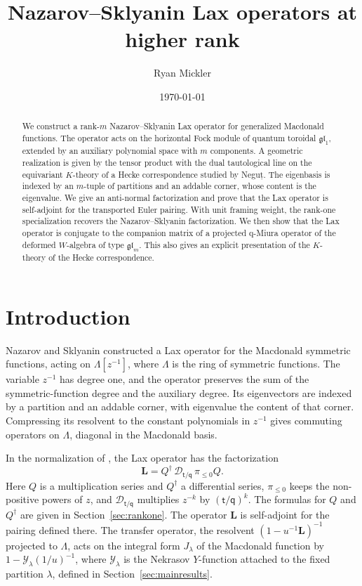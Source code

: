 \documentclass[11pt]{amsart}
\title{Nazarov--Sklyanin Lax operators at higher rank}
\author{Ryan Mickler}
\date{\today}
\theoremstyle{definition}
\theoremstyle{remark}
\newcommand{\Mq}{\mathsf q}                      %
\newcommand{\Mt}{\mathsf t}                      %
\newcommand{\La}{\Lambda}                        %
\newcommand{\CY}{\mathcal Y}
\newcommand{\Yfn}[1]{\CY_{#1}}                   %
\newcommand{\LL}{\mathbf L}
\newcommand{\DD}{\mathcal D}
\newcommand{\Twist}[1]{\DD_{#1}}                 %
\newcommand{\pile}{\pi_{\leq0}}                  %
\newcommand{\Qcr}{Q}                             %
\newcommand{\Qan}{Q^\dagger}                     %
\newcommand{\Negut}{Neguț}
\begin{document}
\maketitle

\begin{abstract}
We construct a rank-\(m\) Nazarov--Sklyanin Lax operator for generalized Macdonald functions.
The operator acts on the horizontal Fock module of quantum toroidal \(\mathfrak{gl}_1\), extended by an
auxiliary polynomial space with \(m\) components. A geometric realization is given by the tensor product
with the dual tautological line on the equivariant \(K\)-theory of a Hecke correspondence studied by \Negut.
The eigenbasis is indexed by an \(m\)-tuple of partitions and an addable
corner, whose content is the eigenvalue.
We give an anti-normal factorization and prove that the Lax operator is self-adjoint
for the transported Euler pairing. With unit framing weight, the rank-one
specialization recovers the Nazarov--Sklyanin factorization.
We then show that the Lax operator is conjugate to the
companion matrix of a projected q-Miura operator of the deformed \(W\)-algebra of type
\(\mathfrak{gl}_m\).
This also gives an explicit presentation
of the \(K\)-theory of the Hecke correspondence. \end{abstract}

\clearpage
\tableofcontents
\clearpage

\section{Introduction}\label{sec:intro}

Nazarov and Sklyanin \cite{NS} constructed a Lax operator for the Macdonald symmetric functions,
acting on \(\La[z^{-1}]\), where \(\La\) is the ring of symmetric functions.
The variable \(z^{-1}\) has degree
one, and the operator preserves the sum of the symmetric-function degree and the auxiliary
degree. Its eigenvectors are indexed by a partition and an addable corner, with eigenvalue
the content of that corner. Compressing its resolvent to the constant polynomials in \(z^{-1}\)
gives commuting operators on \(\La\), diagonal in the Macdonald basis.

In the normalization of \cite{M26}, the Lax operator has the factorization
\begin{equation}\label{eq:rankoneNS}
 \LL=\Qan\,\Twist{\Mt/\Mq}\,\pile\Qcr.
\end{equation}
Here \(\Qcr\) is a multiplication series and \(\Qan\) a differential series,
\(\pile\) keeps the non-positive powers of \(z\), and \(\Twist{\Mt/\Mq}\) multiplies
\(z^{-k}\) by \((\Mt/\Mq)^k\). The formulas for \(\Qcr\) and \(\Qan\) are given in
Section~\ref{sec:rankone}. The operator \(\LL\) is self-adjoint for the pairing defined there.
The transfer operator, the resolvent \((1-u^{-1}\LL)^{-1}\) projected to \(\La\), acts on the integral form \(J_\lambda\) of the Macdonald function by
\(1-\Yfn{\lambda}(1/u)^{-1}\), where \(\Yfn{\lambda}\) is the Nekrasov \(Y\)-function attached
to the fixed partition \(\lambda\), defined in Section~\ref{sec:mainresults}.
\end{document}
